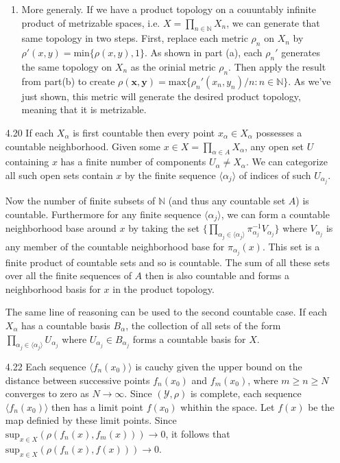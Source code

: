 \documentclass[11pt,letter]{article}
\begin{document}
\begin{enumerate}
\begin{enumerate}
        \item More generaly. If we have a product topology on a couuntably infinite product of metrizable spaces, i.e. $X = \prod_{n \in \mathbb{N}} X_n$, we can generate that same topology in two steps. First, replace each metric $\rho_n$ on $X_n$ by $\rho'(x,y) = \text{min}\{\rho(x,y),1\}$. As shown in part (a), each $\rho_n'$ generates the same topology on $X_n$ as the orinial metric $\rho_n$. Then apply the result from part(b) to create $\rho(\mathbf{x},\mathbf{y}) = \text{max}\{\rho_n'(x_n,y_n)/n: n \in \mathbb{N}\}$. As we've just shown, this metric will generate the desired product topology, meaning that it is metrizable.
    \end{enumerate}
        
    \item[4.20] If each $X_\alpha$ is first countable then every point $x_\alpha \in X_\alpha$ possesses a countable neighborhood. Given some $x \in X = \prod_{\alpha \in A} X_\alpha$, any open set $U$ containing $x$ has a finite number of components $U_\alpha \ne X_\alpha$. We can categorize all such open sets contain $x$ by the finite sequence $\langle \alpha_j \rangle$ of indices of such $U_{\alpha_j}$.
    
    Now the number of finite subsets of $\mathbb{N}$ (and thus any countable set $A$) is countable. Furthermore for any finite sequence $\langle \alpha_j \rangle$, we can form a countable neighborhood base around $x$ by taking the set $\{\prod_{\alpha_j \in \langle \alpha_j \rangle} \pi_{\alpha_j}^{-1}V_{\alpha_j}\}$ where $V_{\alpha_j}$ is any member of the countable neighborhood base for $\pi_{\alpha_j}(x)$. This set is a finite product of countable sets and so is countable. The sum of all these sets over all the finite sequences of $A$ then is also countable and forms a neighborhood basis for $x$ in the product topology.

    The same line of reasoning can be used to the second countable case. If each $X_\alpha$ has a countable basis $B_\alpha$, the collection of all sets of the form $\prod_{\alpha_j \in \langle \alpha_j \rangle} U_{\alpha_j}$ where $U_{\alpha_j} \in B_{\alpha_j}$ forms a countable basis for $X$.
    \newpage 
    \item[4.22] Each sequence $\langle f_n(x_0) \rangle$ is cauchy given the upper bound on the distance between successive points $f_n(x_0)$ and $f_m(x_0)$, where $m \ge n \ge N$ converges to zero as $N \rightarrow \infty$. Since $(\mathcal{Y},\rho)$ is complete, each sequence $\langle f_n(x_0) \rangle$ then has a limit point $f(x_0)$ whithin the space. Let $f(x)$ be the map definied by these limit points. Since $\text{sup}_{x\in X}(\rho(f_n(x),f_m(x))) \rightarrow 0$, it follows that $\text{sup}_{x\in X}(\rho(f_n(x),f(x))) \rightarrow 0$.
    

\end{enumerate}
\end{document}
